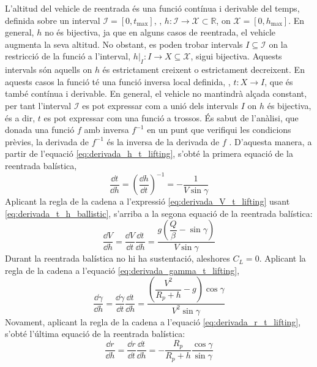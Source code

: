 L'altitud del vehicle de reentrada és una funció contínua i derivable del temps, definida sobre un interval $\mathcal{I} = \left[ 0, t_\text{max} \right]$, \ie, $h \colon \mathcal{I} \to \mathcal{X} \subset \mathbb{R}$, on $\mathcal{X} = \left[ 0, h_\text{max} \right]$. En general, $h$ no és bijectiva, ja que en alguns casos de reentrada, el vehicle augmenta la seva altitud. No obstant, es poden trobar intervals $I \subseteq \mathcal{I}$ on la restricció de la funció a l'interval, $h \vert_{I} \colon I \to X \subseteq \mathcal{X}$, sigui bijectiva. Aquests intervals són aquells on $h$ és estrictament creixent o estrictament decreixent. En aquests casos la funció té una funció inversa local definida, \ie, $t \colon X \to I$, que és també contínua i derivable. En general, el vehicle no mantindrà alçada constant, per tant l'interval $\mathcal{I}$ es pot expressar com a unió dels intervals $I$ on $h$ és bijectiva, és a dir, $t$ es pot expressar com una funció a trossos. És sabut de l'anàlisi, que donada una funció $f$ amb inversa $f^{-1}$ en un punt que verifiqui les condicions prèvies, la derivada de $f^{-1}$ és la inversa de la derivada de $f$ \cite{zorich}. D'aquesta manera, a partir de l'equació \eqref{eq:derivada_h_t_lifting}, s'obté la primera equació de la reentrada balística,
\begin{equation} \label{eq:derivada_t_h_ballistic}
    \frac{\dd t}{\dd h} = \left( \frac{\dd h}{\dd t} \right)^{-1} = - \frac{1}{V \sin{\gamma}}
\end{equation}
Aplicant la regla de la cadena a l'expressió \eqref{eq:derivada_V_t_lifting} usant \eqref{eq:derivada_t_h_ballistic}, s'arriba a la segona equació de la reentrada balística:
\begin{equation} \label{eq:derivada_V_h_ballistic}
    \frac{\dd V}{\dd h} = \frac{\dd V}{\dd t} \frac{\dd t}{\dd h} = 
    \frac{ g \left( \dfrac{Q}{\beta} - \sin{\gamma} \right)}{V \sin{\gamma}}
\end{equation}
Durant la reentrada balística no hi ha sustentació, aleshores $C_L = 0$. Aplicant la regla de la cadena a l'equació \eqref{eq:derivada_gamma_t_lifting},
\begin{equation} \label{eq:derivada_gamma_h_ballistic}
    \frac{\dd \gamma}{\dd h} = \frac{\dd \gamma}{\dd t} \frac{\dd t}{\dd h} = 
    \frac{\left( \dfrac{V^2}{R_p + h} - g \right) \cos{\gamma}}{V^2 \sin{\gamma}}
\end{equation}
Novament, aplicant la regla de la cadena a l'equació \eqref{eq:derivada_r_t_lifting}, s'obté l'última equació de la reentrada balística:
\begin{equation} \label{eq:derivada_r_h_ballistic}
    \frac{\dd r}{\dd h} = \frac{\dd r}{\dd t} \frac{\dd t}{\dd h} = - \frac{R_p}{R_p + h} \frac{\cos{\gamma}}{\sin{\gamma}}
\end{equation}



